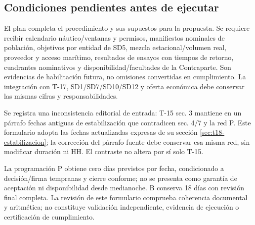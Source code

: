 \subsection{Condiciones pendientes antes de ejecutar}
El plan completa el procedimiento y sus supuestos para la propuesta. Se requiere recibir calendario náutico/ventanas y permisos, manifiestos nominales de población, objetivos por entidad de SD5, mezcla estacional/volumen real, proveedor y acceso marítimo, resultados de ensayos con tiempos de retorno, cuadrantes nominativos y disponibilidad/facultades de la Contraparte. Son evidencias de habilitación futura, no omisiones convertidas en cumplimiento. La integración con T-17, SD1/SD7/SD10/SD12 y oferta económica debe conservar las mismas cifras y responsabilidades.

Se registra una inconsistencia editorial de entrada: T-15 sec. 3 mantiene en un párrafo fechas antiguas de estabilización que contradicen sec. 4/7 y la red P. Este formulario adopta las fechas actualizadas expresas de su sección \ref{sec:t18-estabilizacion}; la corrección del párrafo fuente debe conservar esa misma red, sin modificar duración ni HH. El contraste no altera por sí solo T-15.

La programación P obtiene cero días previstos por fecha, condicionado a decisión/firma tempranas y cierre conforme; no se presenta como garantía de aceptación ni disponibilidad desde medianoche. B conserva 18 días con revisión final completa. La revisión de este formulario comprueba coherencia documental y aritmética; no constituye validación independiente, evidencia de ejecución o certificación de cumplimiento.

